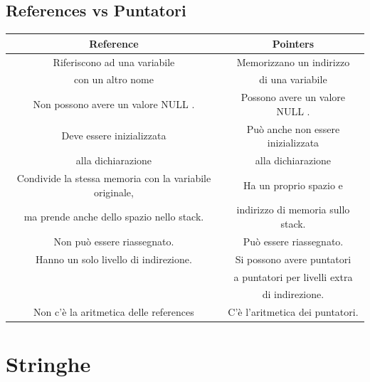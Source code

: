 \subsection{References vs Puntatori}

\begin{tabular}{|c|c|}
	\hline
	\textbf{Reference} & \textbf{Pointers} \\
	\hline
	\textsf{\small Riferiscono ad una variabile } & \textsf{\small Memorizzano un indirizzo } \\
	\textsf{\small con un altro nome} & \textsf{\small di una variabile} \\
	\hline
	\textsf{\small Non possono avere un valore \color{myblue2}NULL \normalcolor.} & \textsf{\small Possono avere un valore \color{myblue2}NULL \normalcolor.} \\
	\hline
	\textsf{\small Deve essere inizializzata } & \textsf{\small Può anche non essere inizializzata } \\
	\textsf{\small alla dichiarazione} & \textsf{\small alla dichiarazione} \\
	\hline
	\textsf{\small Condivide la stessa memoria con la variabile originale, } & \textsf{\small Ha un proprio spazio e } \\
	\textsf{\small ma prende anche dello spazio nello stack.} & \textsf{\small indirizzo di memoria sullo stack.} \\
	\hline
	\textsf{\small Non può essere riassegnato.} & \textsf{\small Può essere riassegnato.} \\
	\hline
	\textsf{\small Hanno un solo livello di indirezione.} & \textsf{\small Si possono avere puntatori } \\
	\textsf{\small } & \textsf{\small a puntatori per livelli extra } \\
	\textsf{\small } & \textsf{\small di indirezione.} \\
	\hline
	\textsf{\small Non c'è la aritmetica delle references} & \textsf{\small C'è l'aritmetica dei puntatori.} \\
	\hline
\end{tabular}


\newpage

\section{Stringhe}

